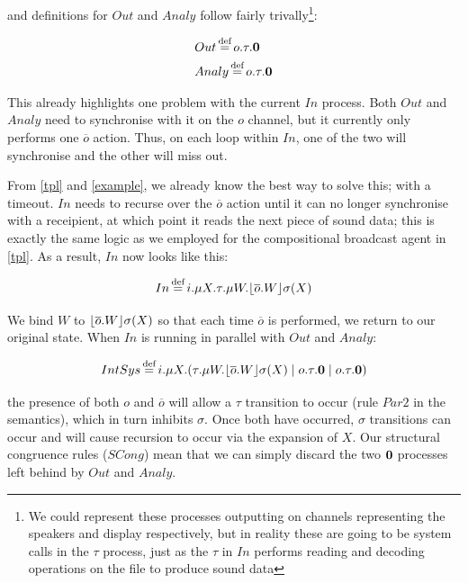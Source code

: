 and definitions for $Out$ and $Analy$ follow fairly
trivally\footnote{We could represent these processes outputting on
  channels representing the speakers and display respectively, but in
  reality these are going to be system calls in the $\tau$ process,
  just as the $\tau$ in $In$ performs reading and decoding
  operations on the file to produce sound data}:

\begin{equation}
\begin{aligned}
  & Out \operatorname{\stackrel{\textrm{def}}{=}} o.\tau.\textbf{0} \\
  & Analy \operatorname{\stackrel{\textrm{def}}{=}} o.\tau.\textbf{0}
\end{aligned}
\end{equation}

This already highlights one problem with the current $In$ process.
Both $Out$ and $Analy$ need to synchronise with it on the $o$ channel,
but it currently only performs one $\overline{o}$ action.  Thus, on
each loop within $In$, one of the two will synchronise and the other
will miss out.

From \ref{tpl} and \ref{example}, we already know the best way to
solve this; with a timeout.  $In$ needs to recurse over the
$\overline{o}$ action until it can no longer synchronise with a
receipient, at which point it reads the next piece of sound data; this
is exactly the same logic as we employed for the compositional
broadcast agent in \ref{tpl}.  As a result, $In$ now looks like this:

\begin{equation}
  In \operatorname{\stackrel{\textrm{def}}{=}} i.\mu X.\tau.\mu W.\lfloor{\overline{o}.W}\rfloor {\sigma} ({X})
\end{equation}

\noindent We bind $W$ to $\lfloor{\overline{o}.W}\rfloor {\sigma} ({X})$ so that
each time $\overline{o}$ is performed, we return to our original state.
When $In$ is running in parallel with $Out$ and $Analy$:

\begin{equation}
  IntSys \operatorname{\stackrel{\textrm{def}}{=}} i.\mu X.(\tau.\mu W.\lfloor{\overline{o}.W}\rfloor {\sigma} ({X}) \;|\; o.\tau.\textbf{0} \;|\; o.\tau.\textbf{0})
\end{equation}

\noindent the presence of both $o$ and $\overline{o}$ will allow a
$\tau$ transition to occur (rule $Par2$ in the semantics), which in
turn inhibits $\sigma$.  Once both have occurred, $\sigma$ transitions
can occur and will cause recursion to occur via the expansion of $X$.
Our structural congruence rules ($SCong$) mean that we can simply
discard the two $\textbf{0}$ processes left behind by $Out$ and $Analy$.

